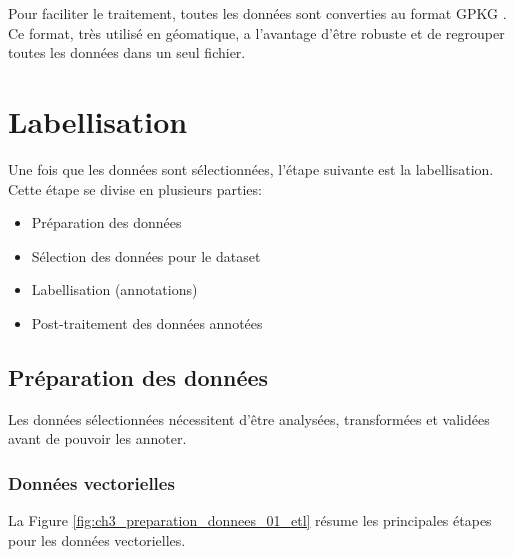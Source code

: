 Pour faciliter le traitement, toutes les données sont converties au format GPKG \cite{noauthor_ogc_nodate}. Ce format, très utilisé en géomatique, a l'avantage d'être robuste et de regrouper toutes les données dans un seul fichier.
\newpage

\section{Labellisation}
Une fois que les données sont sélectionnées, l'étape suivante est la labellisation. Cette étape se divise en plusieurs parties:
\begin{itemize}
    \item Préparation des données
    \item Sélection des données pour le dataset
    \item Labellisation (annotations)
    \item Post-traitement des données annotées
\end{itemize}

\subsection{Préparation des données}
Les données sélectionnées nécessitent d'être analysées, transformées et validées avant de pouvoir les annoter.

\subsubsection{Données vectorielles}
La Figure \ref{fig:ch3_preparation_donnees_01_etl} résume les principales étapes pour les données vectorielles.

